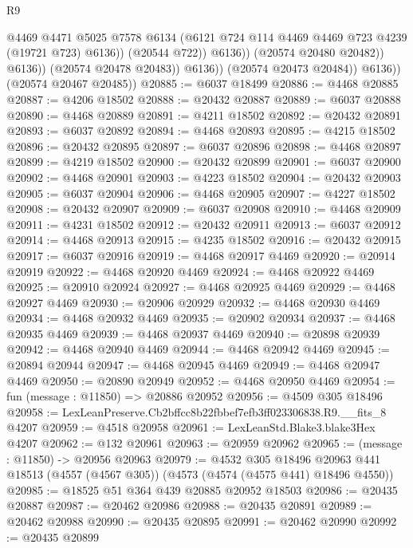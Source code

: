 \begin{lexlean}{R9}
\begin{coremodule}
                                @4469
                                @4471
                                @5025
                                @7578
                                @6134
                                (@6121 @724 @114 @4469 @4469 @723 @4239 (@19721 @723) @6136))
                              (@20544 @722))
                            @6136))
                        (@20574 @20480 @20482))
                      @6136))
                  (@20574 @20478 @20483))
                @6136))
            (@20574 @20473 @20484))
          @6136))
      (@20574 @20467 @20485))
@20885 := @6037 @18499
@20886 := @4468 @20885
@20887 := @4206 @18502
@20888 := @20432 @20887
@20889 := @6037 @20888
@20890 := @4468 @20889
@20891 := @4211 @18502
@20892 := @20432 @20891
@20893 := @6037 @20892
@20894 := @4468 @20893
@20895 := @4215 @18502
@20896 := @20432 @20895
@20897 := @6037 @20896
@20898 := @4468 @20897
@20899 := @4219 @18502
@20900 := @20432 @20899
@20901 := @6037 @20900
@20902 := @4468 @20901
@20903 := @4223 @18502
@20904 := @20432 @20903
@20905 := @6037 @20904
@20906 := @4468 @20905
@20907 := @4227 @18502
@20908 := @20432 @20907
@20909 := @6037 @20908
@20910 := @4468 @20909
@20911 := @4231 @18502
@20912 := @20432 @20911
@20913 := @6037 @20912
@20914 := @4468 @20913
@20915 := @4235 @18502
@20916 := @20432 @20915
@20917 := @6037 @20916
@20919 := @4468 @20917 @4469
@20920 := @20914 @20919
@20922 := @4468 @20920 @4469
@20924 := @4468 @20922 @4469
@20925 := @20910 @20924
@20927 := @4468 @20925 @4469
@20929 := @4468 @20927 @4469
@20930 := @20906 @20929
@20932 := @4468 @20930 @4469
@20934 := @4468 @20932 @4469
@20935 := @20902 @20934
@20937 := @4468 @20935 @4469
@20939 := @4468 @20937 @4469
@20940 := @20898 @20939
@20942 := @4468 @20940 @4469
@20944 := @4468 @20942 @4469
@20945 := @20894 @20944
@20947 := @4468 @20945 @4469
@20949 := @4468 @20947 @4469
@20950 := @20890 @20949
@20952 := @4468 @20950 @4469
@20954 := fun (message : @11850) => @20886 @20952
@20956 := @4509 @305 @18496
@20958 := LexLeanPreserve.Cb2bffcc8b22fbbef7efb3ff023306838.R9.__fits_8 @4207
@20959 := @4518 @20958
@20961 := LexLeanStd.Blake3.blake3Hex @4207
@20962 := @132 @20961
@20963 := @20959 @20962
@20965 := (message : @11850) -> @20956 @20963
@20979 := @4532
    @305
    @18496
    @20963
    @441
    @18513
    (@4557 (@4567 @305))
    (@4573 (@4574 (@4575 @441) @18496 @4550))
@20985 := @18525 @51 @364 @439 @20885 @20952 @18503
@20986 := @20435 @20887
@20987 := @20462 @20986
@20988 := @20435 @20891
@20989 := @20462 @20988
@20990 := @20435 @20895
@20991 := @20462 @20990
@20992 := @20435 @20899

\end{coremodule}
\end{lexlean}
